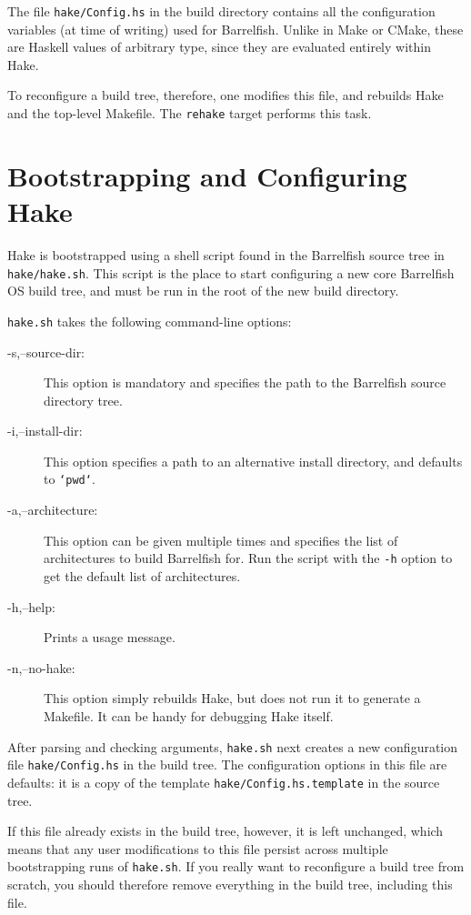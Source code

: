 \documentclass[a4paper,twoside]{report} %
\begin{document}
The file \texttt{hake/Config.hs} in the build directory contains all
the configuration variables (at time of writing) used for Barrelfish.
Unlike in Make or CMake, these are Haskell values of arbitrary type,
since they are evaluated entirely within Hake. 

To reconfigure a build tree, therefore, one modifies this file,
and rebuilds Hake and the top-level Makefile.
The \texttt{rehake} target performs this task.

\chapter{Bootstrapping and Configuring Hake}

Hake is bootstrapped using a shell script found in the Barrelfish
source tree in \texttt{hake/hake.sh}.  This script is the place to
start configuring a new core Barrelfish OS build tree, and must be
run in the root of the new build directory. 

\texttt{hake.sh} takes the following command-line options:
\begin{description}
\item[-s,--source-dir:] This option is mandatory and specifies the
  path to the Barrelfish source directory tree.
\item[-i,--install-dir:] This option specifies a path to an
  alternative install directory, and defaults to \texttt{`pwd`}.
\item[-a,--architecture:] This option can be given multiple times and
  specifies the list of architectures to build Barrelfish for.  Run
  the script with the \texttt{-h} option to get the default list of
  architectures. 
\item[-h,--help:] Prints a usage message.
\item[-n,--no-hake:] This option simply rebuilds Hake, but does not
  run it to generate a Makefile. It can be handy for debugging Hake
  itself. 
\end{description}

After parsing and checking arguments, \texttt{hake.sh} next creates a new
configuration file \texttt{hake/Config.hs} in the build tree.   The
configuration options in this file are defaults: it is a copy of the
template \texttt{hake/Config.hs.template} in the source tree. 

If this file already exists in the build tree, however, it is left
unchanged, which means that any user modifications to this file
persist across multiple bootstrapping runs of \texttt{hake.sh}.
If you really want to reconfigure a build tree from scratch, you
should therefore remove everything in the build tree, including this
file. 
\end{document}
